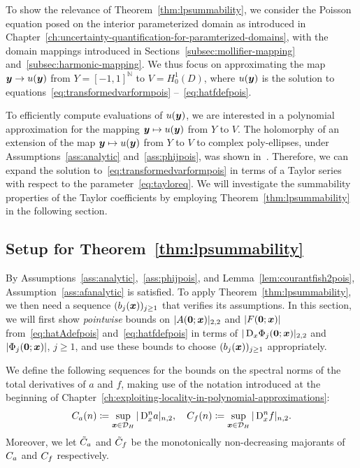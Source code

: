 \label{sec:modelproblem}
To show the relevance of Theorem~\ref{thm:lpsummability}, we consider the Poisson equation posed on the interior parameterized domain as introduced in Chapter~\ref{ch:uncertainty-quantification-for-paramterized-domains}, with the domain mappings introduced in Sections~\ref{subsec:mollifier-mapping} and~\ref{subsec:harmonic-mapping}.
We thus focus on approximating the map ${\bm{y}}\to u({\bm{y}})$ from $Y=[-1,1]^\mathbb{N}$ to $V=H_0^1(D)$, where $u({\bm{y}})$ is the solution to equations~\eqref{eq:transformedvarformpois} --~\eqref{eq:hatfdefpois}.

To efficiently compute evaluations of ${u}({\bm{y}})$, we are interested in a polynomial approximation for the mapping ${\bm{y}} \mapsto {u}({\bm{y}})$ from $Y$ to $V$.
The holomorphy of an extension of the map ${\bm{y}} \mapsto {u}({\bm{y}})$  from $Y$ to $V$ to complex poly-ellipses, under Assumptions~\ref{ass:analytic} and~\ref{ass:phijpois}, was shown in~\cite{chkifa2015,cohen2018,hiptmair2018}.
Therefore, we can expand the solution to~\eqref{eq:transformedvarformpois} in terms of a Taylor series with respect to the parameter~\eqref{eq:tayloreq}.
We will investigate the summability properties of the Taylor coefficients by employing Theorem~\ref{thm:lpsummability} in the following section.

\subsection{Setup for Theorem~\ref{thm:lpsummability}}
\label{subsec:verificationthm}
By Assumptions~\ref{ass:analytic},~\ref{ass:phijpois}, and Lemma~\ref{lem:courantfish2pois}, Assumption~\ref{ass:afanalytic} is satisfied.
To apply Theorem~\ref{thm:lpsummability}, we then need a sequence $(b_j({{\bm{x}}}))_{j \geq 1}$ that verifies its assumptions.
In this section, we will first show   \textsl{pointwise} bounds on $|{A}(\bm{0}; {{\bm{x}}})|_{2,2}$ and $|F(\bm{0}; {{\bm{x}}})|$ from~\eqref{eq:hatAdefpois} and~\eqref{eq:hatfdefpois} in terms of $ |\mathop{}\!\mathrm{D}_x \Phi_j(\bm{0}; {{\bm{x}}}) |_{2,2}$ and $ | \Phi_j (\bm{0}; {{\bm{x}}})|$, $j\geq 1$, and use these bounds to choose $(b_j({{\bm{x}}}))_{j \geq 1}$ appropriately.

We define the following sequences for the bounds on the spectral norms of the total derivatives of $a$ and $f$, making use of the notation introduced at the beginning of Chapter~\ref{ch:exploiting-locality-in-polynomial-approximations}:
\begin{align*}
    {{C}_a}(n)\coloneqq\sup_{{{\bm{x}}} \in \mathcal{D}_H}|\mathop{}\!\mathrm{D}_x^n a|_{n,2}, \quad {{C}_f}(n)\coloneqq\sup_{{{\bm{x}}} \in \mathcal{D}_H}|\mathop{}\!\mathrm{D}_x^n f|_{n,2}.
\end{align*}
Moreover, we let ${\tilde{C}_a}$ and ${\tilde{C}_f}$ be the monotonically non-decreasing majorants of ${{C}_a}$ and ${{C}_f}$\rev{,} respectively.

